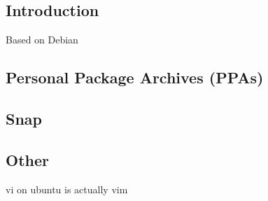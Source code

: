 
\subsection{Introduction}

Based on Debian

\subsection{Personal Package Archives (PPAs)}

\subsection{Snap}

\subsection{Other}
vi on ubuntu is actually vim

